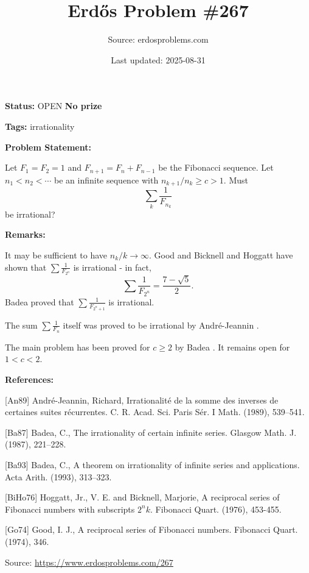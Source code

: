 \documentclass{article}
\title{Erd\H{o}s Problem \#267}
\date{Last updated: 2025-08-31}
\author{Source: erdosproblems.com}
\begin{document}
\maketitle

\noindent\textbf{Status:} OPEN \quad \textbf{No prize}

\noindent\textbf{Tags:} irrationality

\medskip
\noindent\textbf{Problem Statement:}

Let $F_1=F_2=1$ and $F_{n+1}=F_n+F_{n-1}$ be the Fibonacci sequence. Let $n_1<n_2<\cdots $ be an infinite sequence with $n_{k+1}/n_k \geq c>1$. Must\[\sum_k\frac{1}{F_{n_k}}\]be irrational?

\bigskip
\noindent\textbf{Remarks:}

It may be sufficient to have $n_k/k\to \infty$. Good \cite{Go74} and Bicknell and Hoggatt \cite{BiHo76} have shown that $\sum \frac{1}{F_{2^n}}$ is irrational - in fact,\[\sum \frac{1}{F_{2^n}}=\frac{7-\sqrt{5}}{2}.\]Badea \cite{Ba87} proved that $\sum \frac{1}{F_{2^n+1}}$ is irrational. 

The sum $\sum \frac{1}{F_n}$ itself was proved to be irrational by Andr\'{e}-Jeannin \cite{An89}.

The main problem has been proved for $c\geq 2$ by Badea \cite{Ba93}. It remains open for $1<c<2$.

\bigskip
\noindent\textbf{References:}

[An89] Andr\'{e}-Jeannin, Richard, Irrationalit\'{e}{} de la somme des inverses de certaines suites r\'{e}currentes. C. R. Acad. Sci. Paris S\'{e}r. I Math. (1989), 539--541.
 
 [Ba87] Badea, C., The irrationality of certain infinite series. Glasgow Math. J. (1987), 221--228.
 
 [Ba93] Badea, C., A theorem on irrationality of infinite series and
applications. Acta Arith. (1993), 313--323.
 
 [BiHo76] Hoggatt, Jr., V. E. and Bicknell, Marjorie, A reciprocal series of Fibonacci numbers with subscripts $2^nk$. Fibonacci Quart. (1976), 453-455.
 
 [Go74] Good, I. J., A reciprocal series of Fibonacci numbers. Fibonacci Quart. (1974), 346.

\bigskip
\noindent\small{Source: \url{https://www.erdosproblems.com/267}}
\end{document}
